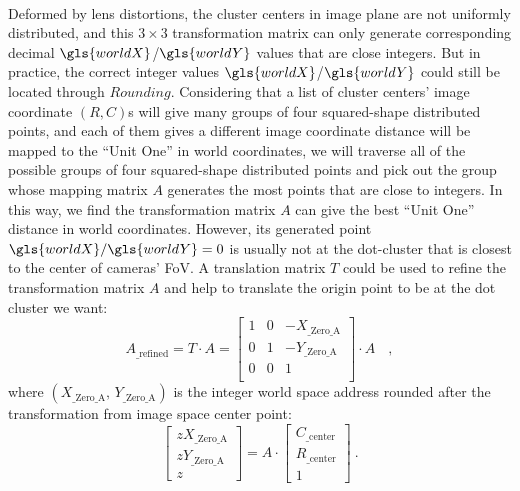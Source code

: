 \\\indent%
Deformed by lens distortions, the cluster centers in image plane are not uniformly distributed, and this $3\times3$ transformation matrix can only generate corresponding decimal \(\gls{worldX}\)/\(\gls{worldY}\) values that are close integers. But in practice, the correct integer values \(\gls{worldX}\)/\(\gls{worldY}\) could still be located through \(Rounding\). Considering that a list of cluster centers' image coordinate \((R, C)\)s will give many groups of four squared-shape distributed points, and each of them gives a different image coordinate distance will be mapped to the \enquote{Unit One} in world coordinates, we will traverse all of the possible groups of four squared-shape distributed points and pick out the group whose mapping matrix \(A\) generates the most points that are close to integers. %
%
In this way, we find the transformation matrix \(A\) can give the best \enquote{Unit One} distance in world coordinates. However, its generated point \(\gls{worldX}/\gls{worldY} = 0\) is usually not at the dot-cluster that is closest to the center of cameras' \gls{FoV}. A translation matrix \(T\) could be used to refine the transformation matrix \(A\) and help to translate the origin point to be at the dot cluster we want:%
%
\begin{equation}
%
A_{\text{\_refined}}%
= %
T \cdot A %
= %
\begin{bmatrix} 
1 & 0 & -X_{\text{\_Zero\_A}} \\%
0 & 1 & -Y_{\text{\_Zero\_A}} \\%
0 & 0 &   1 \\%
\end{bmatrix}%
\cdot A%
\, \, \, \ \ ,%
\end{equation}%
%
where \((X_{\text{\_Zero\_A}}, \, Y_{\text{\_Zero\_A}})\) is the integer world space address rounded after the transformation from image space center point:%
%
\begin{equation}
%
\left[ \begin{array}{c} %
zX_{\text{\_Zero\_A}} \\ zY_{\text{\_Zero\_A}} \\ z \end{array} \right] %
= %
A\cdot \left[ \begin{array}{c} %
C_{\text{\_center}} \\ R_{\text{\_center}} \\ 1 \end{array} \right] %
 \ .%
\end{equation}%
